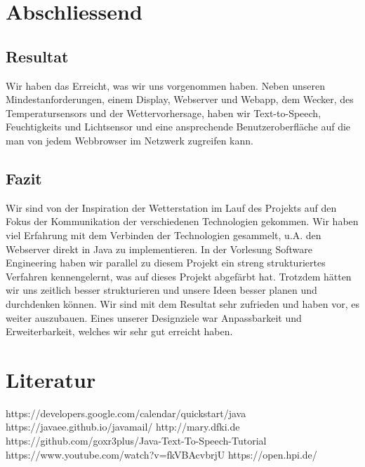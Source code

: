 \documentclass[11pt,a4paper]{article}
\begin{document}
\section{Abschliessend}
\subsection{Resultat}
Wir haben das Erreicht, was wir uns vorgenommen haben. Neben unseren Mindestanforderungen, einem Display, Webserver und Webapp, dem Wecker, des Temperatursensors und der Wettervorhersage, haben wir Text-to-Speech, Feuchtigkeits und Lichtsensor und eine ansprechende Benutzeroberfläche auf die man von jedem Webbrowser im Netzwerk zugreifen kann.

\subsection{Fazit}
Wir sind von der Inspiration der Wetterstation im Lauf des Projekts auf den Fokus der Kommunikation der verschiedenen Technologien gekommen. Wir haben viel Erfahrung mit dem Verbinden der Technologien gesammelt, u.A. den Webserver direkt in Java zu implementieren. In der Vorlesung Software Engineering haben wir parallel zu diesem Projekt ein streng strukturiertes Verfahren kennengelernt, was auf dieses Projekt abgefärbt hat. Trotzdem hätten wir uns zeitlich besser strukturieren und unsere Ideen besser planen und durchdenken können.
Wir sind mit dem Resultat sehr zufrieden und haben vor, es weiter auszubauen. Eines unserer Designziele war Anpassbarkeit und Erweiterbarkeit, welches wir sehr gut erreicht haben.

\section{Literatur}
https://developers.google.com/calendar/quickstart/java \newline
https://javaee.github.io/javamail/ \newline
http://mary.dfki.de \newline
https://github.com/goxr3plus/Java-Text-To-Speech-Tutorial \newline
https://www.youtube.com/watch?v=fkVBAcvbrjU \newline
https://open.hpi.de/ \newline
%
%
\end{document}
